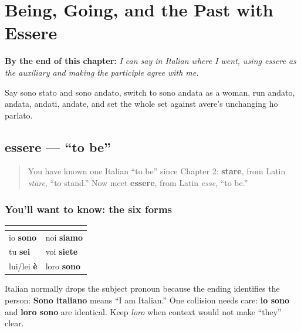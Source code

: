 
\chapter{Being, Going, and the Past with Essere}
\label{ch:it-essere-andare-past}

\begin{chapteropening}
\textbf{By the end of this chapter:} \emph{I can say in Italian where I went, using essere as the auxiliary and making the participle agree with me.}

Say sono stato and sono andato, switch to sono andata as a woman, run andato, andata, andati, andate, and set the whole set against avere's unchanging ho parlato.
\end{chapteropening}

\section[essere]{essere — “to be”}

\label{lesson:IT-C16-essere}



\begin{quote}
You have known one Italian “to be” since Chapter 2: \textbf{stare}, from Latin \emph{stāre}, “to stand.” Now meet \textbf{essere}, from Latin \emph{esse}, “to be.”
\end{quote}

\subsection*{You'll want to know: the six forms}
\noindent
\begin{tabularx}{\linewidth}{@{}>{\raggedright\arraybackslash}X>{\raggedright\arraybackslash}X@{}}
\toprule
\textbf{} & \textbf{} \\
\midrule
io \textbf{sono} & noi \textbf{siamo} \\
tu \textbf{sei} & voi \textbf{siete} \\
lui/lei \textbf{è} & loro \textbf{sono} \\
\bottomrule
\end{tabularx}

Italian normally drops the subject pronoun because the ending identifies the person: \textbf{Sono italiano} means “I am Italian.” One collision needs care: \textbf{io sono} and \textbf{loro sono} are identical. Keep \emph{loro} when context would not make “they” clear.

